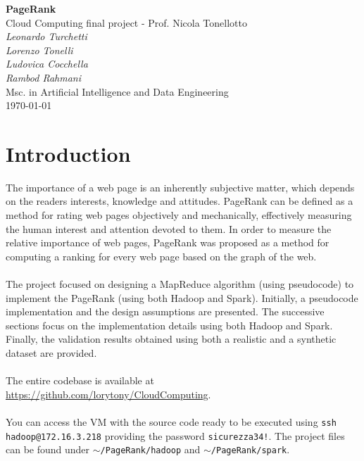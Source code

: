 \documentclass[11pt,a4paper]{article}
\begin{document}
\begin{center}
    \Large\textbf{PageRank}\\
    \vspace{0.2cm}
    \large{Cloud Computing final project - Prof. Nicola Tonellotto}\\
    \vspace{1.0cm}
    \large\textit{Leonardo Turchetti}\\
    \large\textit{Lorenzo Tonelli}\\
    \large\textit{Ludovica Cocchella}\\
    \large\textit{Rambod Rahmani}\\
    \vspace{0.2cm}
    \normalsize{Msc. in Artificial Intelligence and Data Engineering}\\
    \vspace{1.0cm}
    \today
\end{center}
\vspace{1cm}
\tableofcontents
\vspace{1cm}
\section{Introduction}
The importance of a web page is an inherently subjective matter, which depends on the readers interests, knowledge and attitudes. PageRank can be defined as a method for rating web pages objectively and mechanically, effectively measuring the human interest and attention devoted to them. In order to measure the relative importance of web pages, PageRank was proposed as a method for computing a ranking for every web page based on the graph of the web.\\
\\
The project focused on designing a MapReduce algorithm (using pseudocode) to implement the PageRank (using both Hadoop and Spark). Initially, a pseudocode implementation and the design assumptions are presented. The successive sections focus on the implementation details using both Hadoop and Spark. Finally, the validation results obtained using both a realistic and a synthetic dataset are provided.\\
\\
The entire codebase is available at \url{https://github.com/lorytony/CloudComputing}.\\
\\
You can access the VM with the source code ready to be executed using \texttt{ssh hadoop@172.16.3.218} providing the password \texttt{sicurezza34!}. The project files can be found under \texttt{$\sim$/PageRank/hadoop} and \texttt{$\sim$/PageRank/spark}.
\end{document}
